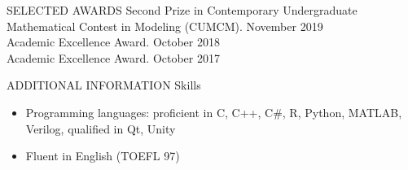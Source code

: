 \documentclass{resume} %
\begin{document}
\begin{rSection}{SELECTED AWARDS}
{Second Prize in Contemporary Undergraduate Mathematical Contest in Modeling (CUMCM).} \hfill November 2019\\
{ Academic Excellence Award.} \hfill October 2018\\ 
{ Academic Excellence Award.} \hfill October 2017\\ 


\end{rSection}


\begin{rSection}{ADDITIONAL INFORMATION}   
Skills
	\begin{itemize}
	\item Programming languages: proficient in C, C++, C\#, R, Python, MATLAB, Verilog, qualified in Qt, Unity
	\item Fluent in English (TOEFL 97)
	\end{itemize}
\end{rSection}
\end{document}
